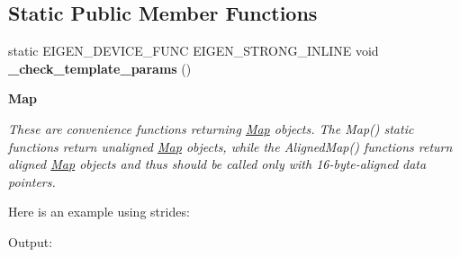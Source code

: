 \subsection*{Static Public Member Functions}
\begin{DoxyCompactItemize}
\item 
\mbox{\label{class_eigen_1_1_plain_object_base_a1415788822fe8339c6b92de20b48f383}} 
static E\+I\+G\+E\+N\+\_\+\+D\+E\+V\+I\+C\+E\+\_\+\+F\+U\+NC E\+I\+G\+E\+N\+\_\+\+S\+T\+R\+O\+N\+G\+\_\+\+I\+N\+L\+I\+NE void {\bfseries \+\_\+check\+\_\+template\+\_\+params} ()
\end{DoxyCompactItemize}
\begin{Indent}\textbf{ Map}\par
{\em These are convenience functions returning \mbox{\hyperlink{class_eigen_1_1_map}{Map}} objects. The Map() static functions return unaligned \mbox{\hyperlink{class_eigen_1_1_map}{Map}} objects, while the Aligned\+Map() functions return aligned \mbox{\hyperlink{class_eigen_1_1_map}{Map}} objects and thus should be called only with 16-\/byte-\/aligned {\itshape data} pointers.

Here is an example using strides\+: 
\begin{DoxyCodeInclude}{0}
\end{DoxyCodeInclude}
 Output\+: 
\begin{DoxyVerbInclude}
\end{DoxyVerbInclude}


}
\end{Indent}
